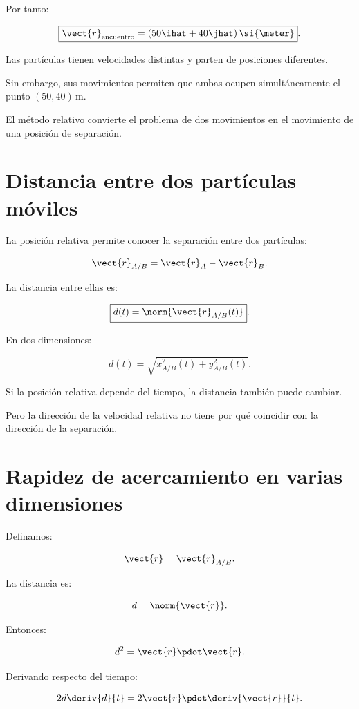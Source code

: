 Por tanto:

\[
\boxed{
\vect{r}_{\mathrm{encuentro}}
=
(50\ihat+40\jhat)\,\si{\meter}
}.
\]

\begin{interpretacion}

Las partículas tienen velocidades distintas
y parten de posiciones diferentes.

Sin embargo, sus movimientos permiten
que ambas ocupen simultáneamente
el punto \((50,40)\,\si{\meter}\).

El método relativo convierte el problema
de dos movimientos en el movimiento
de una posición de separación.

\end{interpretacion}


\section{Distancia entre dos partículas móviles}

La posición relativa permite conocer
la separación entre dos partículas:

\[
\vect{r}_{A/B}
=
\vect{r}_A-\vect{r}_B.
\]

La distancia entre ellas es:

\[
\boxed{
d(t)=\norm{\vect{r}_{A/B}(t)}
}.
\]

En dos dimensiones:

\[
\boxed{
d(t)
=
\sqrt{
x_{A/B}^2(t)+y_{A/B}^2(t)
}
}.
\]

Si la posición relativa depende del tiempo,
la distancia también puede cambiar.

Pero la dirección de la velocidad relativa
no tiene por qué coincidir con la dirección
de la separación.


\section{Rapidez de acercamiento en varias dimensiones}

Definamos:

\[
\vect{r}
=
\vect{r}_{A/B}.
\]

La distancia es:

\[
d=\norm{\vect{r}}.
\]

Entonces:

\[
d^2=\vect{r}\pdot\vect{r}.
\]

Derivando respecto del tiempo:

\[
2d\deriv{d}{t}
=
2\vect{r}\pdot\deriv{\vect{r}}{t}.
\]

